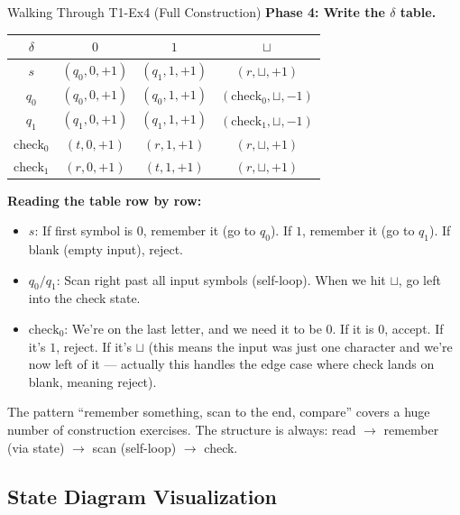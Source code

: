 \documentclass[11pt,a4paper]{article}
\newcommand{\keytakeaway}[1]{%
  \par\vspace{0.3em}%
  \colorbox{yellow!60}{\parbox{\dimexpr\linewidth-2\fboxsep}{#1}}%
  \vspace{0.3em}}
\newcommand{\blank}{\sqcup}
\begin{document}
\begin{examplebox}{Walking Through T1-Ex4 (Full Construction)}
\textbf{Phase 4: Write the $\delta$ table.}
\begin{center}
\begin{tabular}{c|c|c|c}
$\delta$ & $0$ & $1$ & $\blank$ \\
\hline
$s$ & $(q_0, 0, +1)$ & $(q_1, 1, +1)$ & $(r, \blank, +1)$ \\
$q_0$ & $(q_0, 0, +1)$ & $(q_0, 1, +1)$ & $(\text{check}_0, \blank, -1)$ \\
$q_1$ & $(q_1, 0, +1)$ & $(q_1, 1, +1)$ & $(\text{check}_1, \blank, -1)$ \\
$\text{check}_0$ & $(t, 0, +1)$ & $(r, 1, +1)$ & $(r, \blank, +1)$ \\
$\text{check}_1$ & $(r, 0, +1)$ & $(t, 1, +1)$ & $(r, \blank, +1)$ \\
\end{tabular}
\end{center}

\textbf{Reading the table row by row:}
\begin{itemize}
    \item $s$: If first symbol is $0$, remember it (go to $q_0$). If $1$, remember it (go to $q_1$). If blank (empty input), reject.
    \item $q_0/q_1$: Scan right past all input symbols (self-loop). When we hit $\blank$, go left into the check state.
    \item $\text{check}_0$: We're on the last letter, and we need it to be $0$. If it is $0$, accept. If it's $1$, reject. If it's $\blank$ (this means the input was just one character and we're now left of it --- actually this handles the edge case where $\text{check}$ lands on blank, meaning reject).
\end{itemize}

\keytakeaway{The pattern ``remember something, scan to the end, compare'' covers a huge number of construction exercises. The structure is always: read $\to$ remember (via state) $\to$ scan (self-loop) $\to$ check.}
\end{examplebox}

\subsection{State Diagram Visualization}
\end{document}
